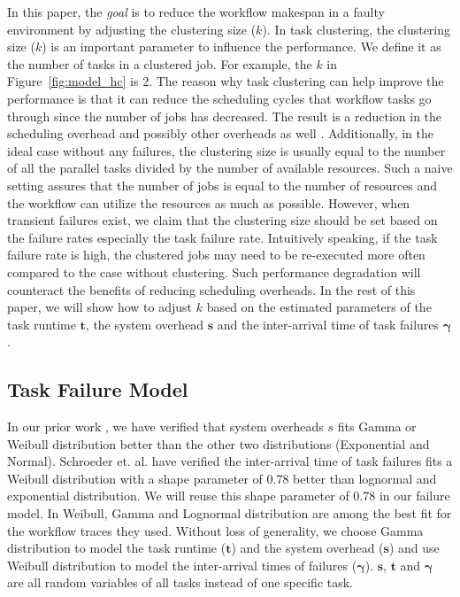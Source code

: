 \documentclass{IOS-Book-Article}
\begin{document}
In this paper, the \emph{goal} is to reduce the workflow makespan in a faulty environment by adjusting the clustering size ($k$). In task clustering, the clustering size ($k$) is an important parameter to influence the performance. We define it as the number of tasks in a clustered job. For example, the $k$ in Figure~\ref{fig:model_hc} is 2. The reason why task clustering can help improve the performance is that it can reduce the scheduling cycles that workflow tasks go through since the number of jobs has decreased. The result is a reduction in the scheduling overhead and possibly other overheads as well \cite{Chen2011}. Additionally, in the ideal case without any failures, the clustering size is usually equal to the number of all the parallel tasks divided by the number of available resources. Such a naive setting assures that the number of jobs is equal to the number of resources and the workflow can utilize the resources as much as possible. However, when transient failures exist, we claim that the clustering size should be set based on the failure rates especially the task failure rate. Intuitively speaking, if the task failure rate is high, the clustered jobs may need to be re-executed more often compared to the case without clustering. Such performance degradation will counteract the benefits of reducing scheduling overheads. In the rest of this paper, we will show how to adjust $k$ based on the estimated parameters of the task runtime $\bm t$, the system overhead $\bm s$ and the inter-arrival time of task failures $\bm\gamma$. 

\subsection{Task Failure Model}




In our prior work \cite{Chen2011}, we have verified that system overheads $s$ fits Gamma or Weibull distribution better than the other two distributions (Exponential and Normal). Schroeder et. al. \cite{Schroeder2006} have verified the inter-arrival time of task failures fits a Weibull distribution with a shape parameter of 0.78 better than lognormal and exponential distribution. We will reuse this shape parameter of 0.78 in our failure model. 
In \cite{Sun2003, Iosup2008} Weibull, Gamma and Lognormal distribution are among the best fit for the workflow traces they used.  Without loss of generality, we choose Gamma distribution to model the task runtime ($\bm t$) and the system overhead ($\bm s$) and use Weibull distribution to model the inter-arrival times of failures ($\bm\gamma$).  $\bm s$, $\bm t$ and $\bm \gamma$ are all random variables of all tasks instead of one specific task. 
\end{document}
